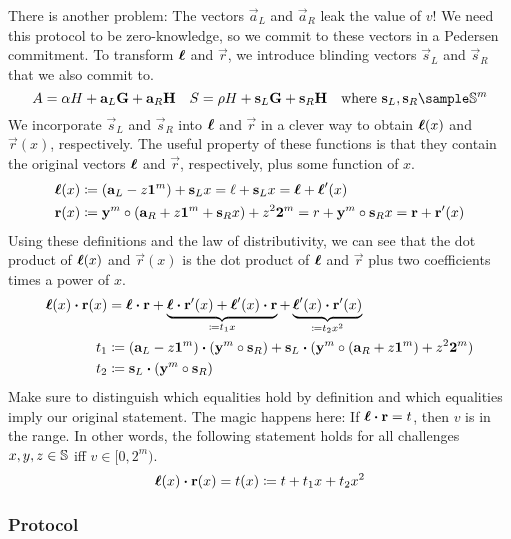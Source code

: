 %
There is another problem:
The vectors $\vec{a}_L$ and $\vec{a}_R$ leak the value of $v$!
We need this protocol to be zero-knowledge,
so we commit to these vectors in a Pedersen commitment.
To transform $\mathbf{\boldsymbol{\ell}}$ and $\vec{r}$,
we introduce blinding vectors $\vec{s}_L$ and $\vec{s}_R$ that we also commit to.
%
\[
    A = \alpha H + \vec{a}_L\vec{G} + \vec{a}_R\vec{H} \quad S = \rho H + \vec{s}_L\vec{G} + \vec{s}_R\vec{H} \quad \text{where}\ \vec{s}_L, \vec{s}_R \sample \scalars^m
\]
%
We incorporate $\vec{s}_L$ and $\vec{s}_R$ into $\mathbf{\boldsymbol{\ell}}$ and $\vec{r}$ in a clever way to obtain $\mathbf{\boldsymbol{\ell}}(x)$ and $\vec{r}(x)$,
respectively.
The useful property of these functions is that they contain the original vectors $\mathbf{\boldsymbol{\ell}}$ and $\vec{r}$,
respectively,
plus some function of $x$.
%
\begin{align*}
    \mathbf{\boldsymbol{\ell}}(x) &\coloneqq (\mathbf{a}_L - z \mathbf{1}^m) + \mathbf{s}_L x = \ell + \mathbf{s}_L x = \mathbf{\boldsymbol{\ell}} + \mathbf{\boldsymbol{\ell}}'(x) \\
    \mathbf{r}(x) &\coloneqq \mathbf{y}^m \circ (\mathbf{a}_R + z \mathbf{1}^m + \mathbf{s}_R x) + z^2 \mathbf{2}^m = r + \mathbf{y}^m \circ \mathbf{s}_R x = \mathbf{r} + \mathbf{r}'(x)
\end{align*}
%
Using these definitions and the law of distributivity,
we can see that the dot product of $\mathbf{\boldsymbol{\ell}}(x)$ and $\vec{r}(x)$
is the dot product of $\mathbf{\boldsymbol{\ell}}$ and $\vec{r}$ plus two coefficients times a power of $x$.
%
\begin{align*}
    \mathbf{\boldsymbol{\ell}}(x) \boldsymbol{\cdot} \mathbf{r}(x)
    &= \mathbf{\boldsymbol{\ell}} \boldsymbol{\cdot} \mathbf{r} + \underbrace{\mathbf{\boldsymbol{\ell}} \boldsymbol{\cdot} \mathbf{r}'(x) + \mathbf{\boldsymbol{\ell}}'(x) \boldsymbol{\cdot} \mathbf{r}}_{\coloneqq t_1x} + \underbrace{\mathbf{\boldsymbol{\ell}}'(x) \boldsymbol{\cdot} \mathbf{r}'(x)}_{\coloneqq t_2x^2} \\
    t_1 &\coloneqq (\mathbf{a}_L - z \mathbf{1}^m) \boldsymbol{\cdot} (\mathbf{y}^m \circ \mathbf{s}_R) + \mathbf{s}_L \boldsymbol{\cdot} (\mathbf{y}^m \circ (\mathbf{a}_R + z \mathbf{1}^m) + z^2 \mathbf{2}^m) \\
    t_2 &\coloneqq \mathbf{s}_L \boldsymbol{\cdot} (\mathbf{y}^m \circ \mathbf{s}_R)
\end{align*}
%
Make sure to distinguish which equalities hold by definition and which equalities imply our original statement.
The magic happens here:
If $\mathbf{\boldsymbol{\ell}} \boldsymbol{\cdot} \mathbf{r} = t$,
then $v$ is in the range.
In other words,
the following statement holds for all challenges $x, y, z \in \mathbb{S}$ iff $v \in [0, 2^m)$.
%
\[
    \mathbf{\boldsymbol{\ell}}(x) \boldsymbol{\cdot} \mathbf{r}(x) = t(x) \coloneqq t + t_1x + t_2x^2
\]

\subsubsection{Protocol}

